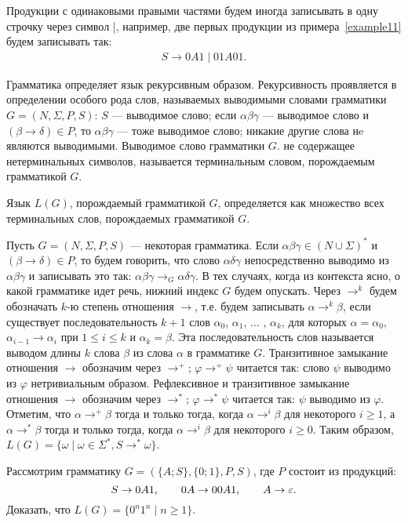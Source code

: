 Продукции с одинаковыми правыми частями будем иногда записывать в одну строчку через символ |, например, две первых продукции из примера~\ref{example11} будем записывать так:
\begin{equation}
\begin{array}{l}
	S \to 0A1 \mid 01A01.
\end{array}
\end{equation}

Грамматика определяет язык рекурсивным образом. Рекурсивность проявляется в определении особого рода слов, называемых выводимыми словами грамматики $G=(N,\Sigma,P,S)$: $S$ --- выводимое слово; если $\alpha\beta\gamma$ --- выводимое слово и $(\beta\to\delta)\in P$, то $\alpha\beta\gamma$ --- тоже выводимое слово; никакие другие слова нe являются выводимыми. Выводимое слово грамматики $G$. не содержащее нетерминальных символов, называется терминальным словом, порождаемым грамматикой $G$.

Язык $L(G)$, порождаемый грамматикой $G$, определяется как множество всех терминальных слов, порождаемых грамматикой $G$.

Пусть $G=(N,\Sigma,P,S)$ --- некоторая грамматика. Если $\alpha\beta\gamma\in(N\cup\Sigma)^*$ и $(\beta\to\delta)\in P$, то будем говорить, что слово $\alpha\delta\gamma$ непосредственно выводимо из $\alpha\beta\gamma$ и записывать это так: $\alpha\beta\gamma\to_G\alpha\delta\gamma$. В тех случаях, когда из контекста ясно, о какой грамматике идет речь, нижний индекс $G$ будем опускать. Через $\to^k$ будем обозначать $k$-ю степень отношения $\to$, т.е. будем записывать $\alpha\to^k\beta$, если существует последовательность $k+1$ слов $\alpha_0$, $\alpha_1$, $\ldots$ , $\alpha_k$, для которых $\alpha=\alpha_0$, $\alpha_{i-1}\to\alpha_i$ при $1\le i\le k$ и $\alpha_k=\beta$. Эта последовательность слов называется выводом длины $k$ слова $\beta$ из слова $\alpha$ в грамматике $G$. Транзитивное замыкание отношения $\to$ обозначим через $\to^+$; $\varphi\to^+\psi$  читается так: слово $\psi$ выводимо из $\varphi$ нетривиальным образом. Рефлексивное и транзитивное замыкание отношения $\to$ обозначим через $\to^*$; $\varphi\to^*\psi$ читается так: $\psi$ выводимо из $\varphi$. Отметим, что $\alpha\to^+\beta$ тогда и только тогда, когда $\alpha\to^i\beta$ для некоторого $i\ge 1$, а $\alpha\to^*\beta$ тогда и только тогда, когда $\alpha\to^i\beta$ для некоторого $i\ge 0$.
Таким образом, $L(G) = \{\omega\mid\omega\in\Sigma^*, S\to^*\omega\}$.

\begin{myproblem}
Рассмотрим грамматику $G=(\{A;S\},\{0;1\},P,S)$, где $P$ состоит из продукций:
\[
    S  \to 0A1,\qquad
    0A \to 00A1,\qquad
    A  \to \varepsilon.
\]
Доказать, что $L(G)=\{0^n1^n\mid n\ge 1\}$.
\end{myproblem}

